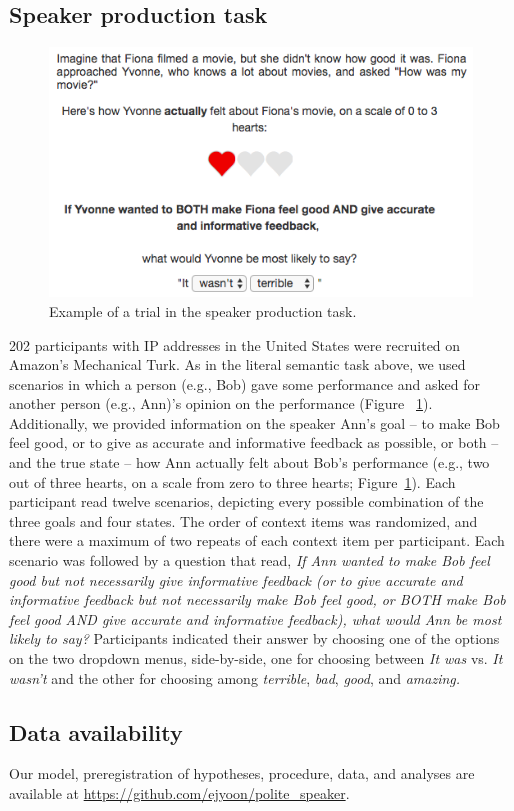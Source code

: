 \documentclass[9pt,twocolumn,twoside,lineno]{main_class_file}
\begin{document}
{\subsection*{Speaker production task}\label{speaker-production-task}

\begin{figure}[!h]
\includegraphics[width=\columnwidth]{fig/screenshot} 
\caption{Example of a trial in the speaker production task.}\label{fig:screenshot}
\end{figure}

202 participants with IP addresses in the United States were recruited
on Amazon's Mechanical Turk. As in the literal semantic task above, we
used scenarios in which a person (e.g., Bob) gave some performance and
asked for another person (e.g., Ann)'s opinion on the performance
(Figure ~\ref{fig:screenshot}). Additionally, we provided information on
the speaker Ann's goal -- to make Bob feel good, or to give as accurate
and informative feedback as possible, or both -- and the true state --
how Ann actually felt about Bob's performance (e.g., two out of three
hearts, on a scale from zero to three hearts;
Figure~\ref{fig:screenshot}). Each participant read twelve scenarios,
depicting every possible combination of the three goals and four states.
The order of context items was randomized, and there were a maximum of
two repeats of each context item per participant. Each scenario was
followed by a question that read, \emph{If Ann wanted to make Bob
feel good but not necessarily give informative feedback (or to give
accurate and informative feedback but not necessarily make Bob feel
good, or BOTH make Bob feel good AND give accurate and informative
feedback), what would Ann be most likely to say?} Participants indicated
their answer by choosing one of the options on the two dropdown menus,
side-by-side, one for choosing between \emph{It was} vs. \emph{It
wasn't} and the other for choosing among \emph{terrible}, \emph{bad},
\emph{good}, and \emph{amazing.}

\subsection*{Data availability}\label{data-availability}

Our model, preregistration of hypotheses, procedure, data, and analyses
are available at \url{https://github.com/ejyoon/polite_speaker}.

}
\end{document}

